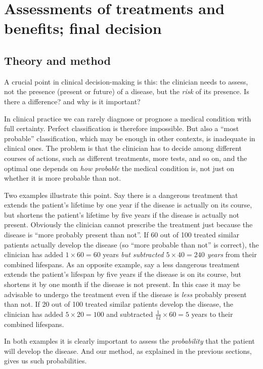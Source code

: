 \documentclass[utf8]{FrontiersinHarvard} %
\renewcommand*{\|}[1][]{\nonscript\:#1\vert\nonscript\:\mathopen{}}
\begin{document}
\section{Assessments of treatments and benefits; final decision}
\label{sec:utilities_step}

\subsection{Theory and method}
\label{sec:expected_utility_theory}


A crucial point in clinical decision-making is this: the clinician needs to assess, not the presence (present or future) of a disease, but the \emph{risk} of its presence. Is there a difference? and why is it important?

In clinical practice we can rarely diagnose or prognose a medical condition with full certainty. Perfect classification is therefore impossible. But also a \enquote{most probable} classification, which may be enough in other contexts, is inadequate in clinical ones. The problem is that the clinician has to decide among different courses of actions, such as different treatments, more tests, and so on, and the optimal one depends on \emph{how probable} the medical condition is, not just on whether it is more probable than not.

Two examples illustrate this point. Say there is a dangerous treatment that extends the patient's lifetime by one year if the disease is actually on its course, but shortens the patient's lifetime by five years if the disease is actually not present. Obviously the clinician cannot prescribe the treatment just because the disease is \enquote{more probably present than not}. If 60 out of 100 treated similar patients actually develop the disease (so \enquote{more probable than not} is correct), the clinician has added $1 \times 60 = 60$ years \emph{but subtracted $\mathit{5 \times 40 = 240}$ years} from their combined lifespans. As an opposite example, say a less dangerous treatment extends the patient's lifespan by five years if the disease is on its course, but shortens it by one month if the disease is not present. In this case it may be advisable to undergo the treatment even if the disease is \emph{less} probably present than not. If 20 out of 100 treated similar patients develop the disease, the clinician has added $5 \times 20=100$ and subtracted $\tfrac{1}{12} \times 60=5$ years to their combined lifespans.

In both examples it is clearly important to assess the \emph{probability} that the patient will develop the disease. And our method, as explained in the previous sections, gives us such probabilities.
\end{document}

